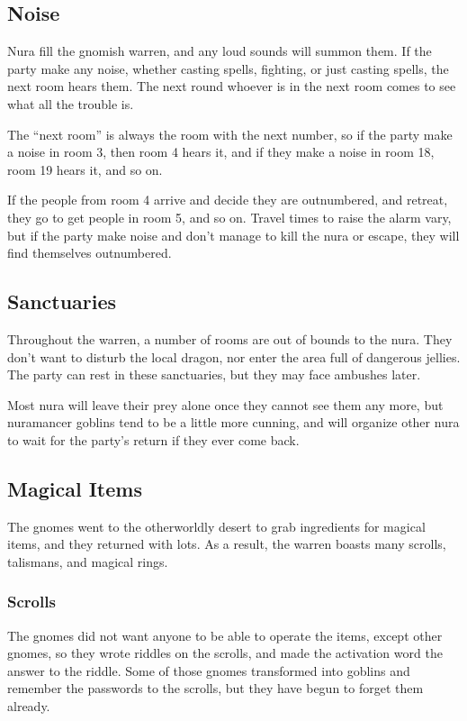 \begin{multicols}{2}
\subsection{Noise}

Nura fill the gnomish warren, and any loud sounds will summon them.
If the party make any noise, whether casting spells, fighting, or just casting spells, the next room hears them.
The next round whoever is in the next room comes to see what all the trouble is.

The ``next room'' is always the room with the next number, so if the party make a noise in room 3, then room 4 hears it, and if they make a noise in room 18, room 19 hears it, and so on.

If the people from room 4 arrive and decide they are outnumbered, and retreat, they go to get people in room 5, and so on.
Travel times to raise the alarm vary, but if the party make noise and don't manage to kill the nura or escape, they will find themselves outnumbered.

\subsection{Sanctuaries}

Throughout the warren, a number of rooms are out of bounds to the nura.
They don't want to disturb the local dragon, nor enter the area full of dangerous jellies.
The party can rest in these sanctuaries, but they may face ambushes later.

Most nura will leave their prey alone once they cannot see them any more, but nuramancer goblins tend to be a little more cunning, and will organize other nura to wait for the party's return if they ever come back.

\subsection{Magical Items}

The gnomes went to the otherworldly desert to grab ingredients for magical items, and they returned with lots.
As a result, the warren boasts many scrolls, talismans, and magical rings.

\subsubsection{Scrolls}

The gnomes did not want anyone to be able to operate the items, except other gnomes, so they wrote riddles on the scrolls, and made the activation word the answer to the riddle.
Some of those gnomes transformed into goblins and remember the passwords to the scrolls, but they have begun to forget them already.


\end{multicols}
